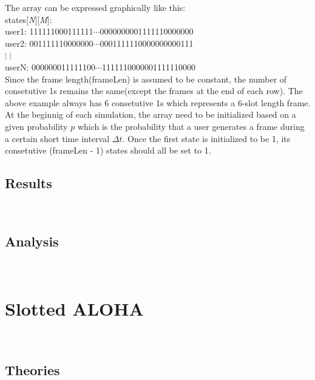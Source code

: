 \documentclass[11pt,oneside,a4paper]{report}
\begin{document}
The array can be expressed graphically like this: \\

states[\emph{N}][\emph{M}]: \\

\qquad user1: 111111000111111\(\cdots\)0000000001111110000000 \\

\qquad user2: 001111110000000\(\cdots\)0001111110000000000111 \\

\qquad\quad \(\vdots\) \hspace{35mm} \(\vdots\) \\

\qquad userN: \hspace{-0.5mm}000000011111100\(\cdots\)1111110000001111110000 \\

Since the frame length(frameLen) is assumed to be constant, the number of consetutive 1s remains the same(except the frames at the end of each row). The above example always has 6 consetutive 1s which represents a 6-slot length frame. \\

At the beginnig of each simulation, the array need to be initialized based on a given probability \(p\) which is the probability that a user generates a frame during a certain short time interval \(\Delta t\). Once the first state is initialized to be 1, its consetutive (frameLen - 1) states should all be set to 1.

\subsection*{Results}

\\

\subsection*{Analysis}

\\

\section*{Slotted ALOHA}

\\

\subsection*{Theories}
\end{document}
